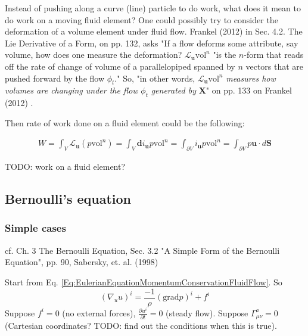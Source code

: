 \documentclass[10pt]{amsart}
\begin{document}
\begin{multicols*}{2}
Instead of pushing along a curve (line) particle to do work, what does it mean to do work on a moving fluid element? One could possibly try to consider the deformation of a volume element under fluid flow. Frankel (2012) \cite{TFrankel2012} in Sec. 4.2. The Lie Derivative of a Form, on pp. 132, asks "If a flow deforms some attribute, say volume, how does one measure the deformation? $\mathcal{L}_{\mathbf{u}}\text{vol}^n$ "is the $n$-form that reads off the rate of change of volume of a parallelopiped spanned by $n$ vectors that are pushed forward by the flow $\phi_t$." So, "in other words, $\mathcal{L}_{\mathbf{u}}\text{vol}^n$ \emph{measures how volumes are changing under the flow} $\phi_t$ \emph{generated by} $\mathbf{X}$" on pp. 133 on Frankel (2012) \cite{TFrankel2012}. 

Then rate of work done on a fluid element could be the following:

\[
\begin{gathered}
W = \int_V \mathcal{L}_{\mathbf{u}}(p \text{vol}^n) = \int_V \mathbf{d} i_{\mathbf{u}} p \text{vol}^n = \int_{\partial V} i_{\mathbf{u}} p \text{vol}^n = \int_{\partial V} p \mathbf{u} \cdot d\mathbf{S} 
\end{gathered}
\]

TODO: work on a fluid element?

\subsection{Bernoulli's equation}

\subsubsection{Simple cases}

cf. Ch. 3 The Bernoulli Equation, Sec. 3.2 "A Simple Form of the Bernoulli Equation", pp. 90, Sabersky, et. al. (1998) \cite{SAHG1998}


Start from Eq. \ref{Eq:EulerianEquationMomentumConservationFluidFlow}. So
\[
(\nabla_u u)^i = \frac{-1}{\rho} (\text{grad}p)^i + f^i
\]
Suppose $f^i=0$ (no external forces), $\frac{\partial u^i}{\partial t} = 0$ (steady flow). Suppose $\Gamma^a_{\mu \nu} =0$ (Cartesian coordinates? TODO: find out the conditions when this is true).


\end{multicols*}
\end{document}
